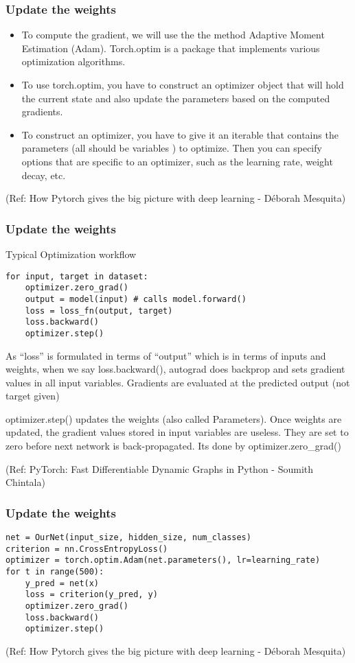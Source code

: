 \begin{frame}[fragile] \frametitle{Update the weights}
\begin{itemize}
\item To compute the gradient, we will use the the method Adaptive Moment Estimation (Adam). Torch.optim is a package that implements various optimization algorithms.
\item To use torch.optim, you have to construct an optimizer object that will hold the current state and also update the parameters based on the computed gradients.
\item To construct an optimizer, you have to give it an iterable that contains the parameters (all should be variables ) to optimize. Then you can specify options that are specific to an optimizer, such as the learning rate, weight decay, etc.
\end{itemize}


  {\tiny (Ref: How Pytorch gives the big picture with deep learning - Déborah Mesquita)}
\end{frame}

\begin{frame}[fragile] \frametitle{Update the weights}
Typical Optimization workflow

 \begin{lstlisting}
for input, target in dataset:
	optimizer.zero_grad()
	output = model(input) # calls model.forward()
	loss = loss_fn(output, target)
	loss.backward()
	optimizer.step()
\end{lstlisting}

As ``loss'' is formulated in terms of ``output'' which is in terms of inputs and weights, when we say loss.backward(), autograd does backprop and sets gradient values in all input variables. Gradients are evaluated at the predicted output (not target given)

optimizer.step() updates the weights (also called Parameters). Once weights are updated, the gradient values stored in input variables are useless. They are set to zero before next network is back-propagated. Its done by optimizer.zero\_grad()

  {\tiny (Ref: PyTorch: Fast Differentiable Dynamic Graphs in Python - Soumith Chintala)}
\end{frame}


\begin{frame}[fragile] \frametitle{Update the weights}


 \begin{lstlisting}
net = OurNet(input_size, hidden_size, num_classes)
criterion = nn.CrossEntropyLoss()
optimizer = torch.optim.Adam(net.parameters(), lr=learning_rate)
for t in range(500):
    y_pred = net(x)
    loss = criterion(y_pred, y)
    optimizer.zero_grad()
    loss.backward()
    optimizer.step()
\end{lstlisting}

  {\tiny (Ref: How Pytorch gives the big picture with deep learning - Déborah Mesquita)}
\end{frame}


